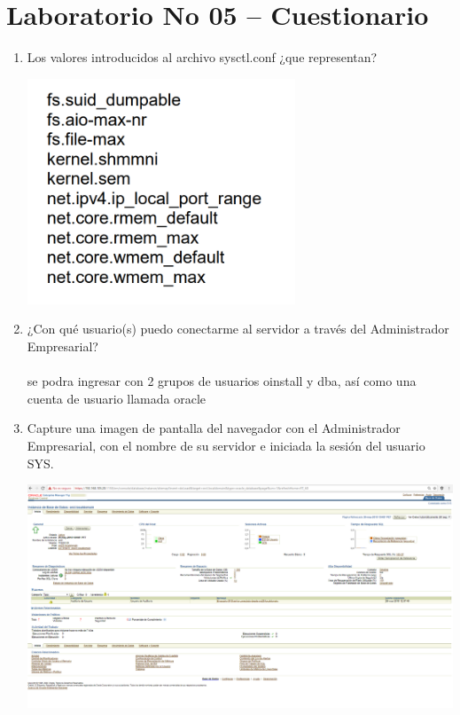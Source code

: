 \section{Laboratorio No 05 – Cuestionario} 

\begin{enumerate}[1.]
	\item Los valores introducidos al archivo sysctl.conf ¿que representan?
	\begin{center}
	\includegraphics[width=8cm]{./Imagenes/actividad_5_1_lab_05}
	\end{center}
	\item ¿Con qué usuario(s) puedo conectarme al servidor a través del Administrador Empresarial?
	\\
	\\ se podra ingresar con 2 grupos de usuarios oinstall y dba, así como una cuenta de usuario llamada oracle

	\item Capture una imagen de pantalla del navegador con el Administrador Empresarial, con el nombre de su servidor e iniciada la sesión del usuario SYS.

	\begin{center}
	\includegraphics[width=15cm]{./Imagenes/Lab5-5_3} 
	\end{center}
	
	

\end{enumerate} 
